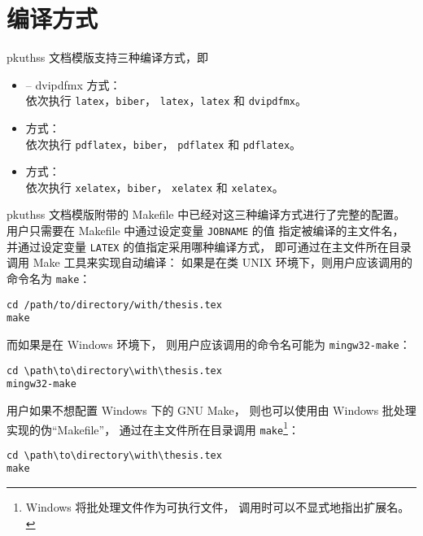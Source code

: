 	\section{编译方式}\label{sec:compile}

	pkuthss 文档模版支持三种编译方式，即
	\begin{itemize}
		\item {} -- dvipdfmx 方式：\\
			依次执行 \verb|latex|，\verb|biber|，%
			\verb|latex|，\verb|latex| 和 \verb|dvipdfmx|。
		\item {} 方式：\\
			依次执行 \verb|pdflatex|，\verb|biber|，%
			\verb|pdflatex| 和 \verb|pdflatex|。
		\item {} 方式：\\
			依次执行 \verb|xelatex|，\verb|biber|，%
			\verb|xelatex| 和 \verb|xelatex|。
	\end{itemize}

	pkuthss 文档模版附带的 Makefile 中已经对这三种编译方式进行了完整的配置。
	用户只需要在 Makefile 中通过设定变量 \verb|JOBNAME| 的值%
	指定被编译的主文件名，
	并通过设定变量 \verb|LATEX| 的值指定采用哪种编译方式，
	即可通过在主文件所在目录调用 Make 工具来实现自动编译：
	如果是在类 UNIX 环境下，则用户应该调用的命令名为 \verb|make|：
\begin{Verbatim}[frame = single]
cd /path/to/directory/with/thesis.tex
make
\end{Verbatim}
	而如果是在 Windows 环境下，
	则用户应该调用的命令名可能为 \verb|mingw32-make|：
\begin{Verbatim}[frame = single]
cd \path\to\directory\with\thesis.tex
mingw32-make
\end{Verbatim}

	用户如果不想配置 Windows 下的 GNU Make，
	则也可以使用由 Windows 批处理实现的伪“Makefile”，
	通过在主文件所在目录调用 \verb|make|\footnote{%
		Windows 将批处理文件作为可执行文件，
		调用时可以不显式地指出扩展名。%
	}：
\begin{Verbatim}[frame = single]
cd \path\to\directory\with\thesis.tex
make
\end{Verbatim}

